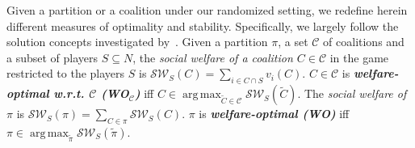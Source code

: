 \documentclass[letterpaper]{article} %
\DeclareMathOperator*{\argmax}{arg\,max}
\begin{document}
Given a partition or a coalition under our randomized setting, we redefine herein different measures of optimality and stability. Specifically, we largely follow the solution concepts investigated by~\cite{peters2016complexity}. %
Given a partition $\pi$, a set $\mathcal{C}$ of coalitions and a subset of players $S \subseteq N$, the \textit{social welfare of a coalition $C \in \mathcal{C}$} in the game restricted to the players $S$ is $\mathcal{SW}_S(C) = \sum_{i \in C \cap S} v_i(C)$. $C \in \mathcal{C}$ is \textit{\textbf{welfare-optimal w.r.t. $\mathbf{\mathcal{C}}$ (WO$\mathbf{_\mathcal{C}}$)}} iff $C \in \argmax_{\tilde{C} \in \mathcal{C}} \mathcal{SW}_S(\tilde{C})$. The \textit{social welfare of $\pi$} is $\mathcal{SW}_S(\pi) = \sum_{C \in \pi} \mathcal{SW}_S(C)$. $\pi$ is \textit{\textbf{welfare-optimal (WO)}} iff $\pi \in \argmax_{\tilde{\pi}} \mathcal{SW}_S(\tilde{\pi})$. 
%
\end{document}
